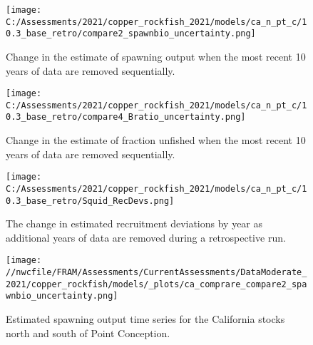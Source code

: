 \documentclass[11pt,
  english,
  a4paper,
]{article}
\begin{document}

\begin{figure}
\centering
\texttt{[image: C:/Assessments/2021/copper\_rockfish\_2021/models/ca\_n\_pt\_c/10.3\_base\_retro/compare2\_spawnbio\_uncertainty.png]}
\caption{Change in the estimate of spawning output when the most recent 10 years of data are removed sequentially.\label{fig:retro-ssb}}
\end{figure}

\tagmcend\tagstructend


\begin{figure}
\centering
\texttt{[image: C:/Assessments/2021/copper\_rockfish\_2021/models/ca\_n\_pt\_c/10.3\_base\_retro/compare4\_Bratio\_uncertainty.png]}
\caption{Change in the estimate of fraction unfished when the most recent 10 years of data are removed sequentially.\label{fig:retro-depl}}
\end{figure}

\tagmcend\tagstructend


\begin{figure}
\centering
\texttt{[image: C:/Assessments/2021/copper\_rockfish\_2021/models/ca\_n\_pt\_c/10.3\_base\_retro/Squid\_RecDevs.png]}
\caption{The change in estimated recruitment deviations by year as additional years of data are removed during a retrospective run.\label{fig:retro-squid}}
\end{figure}

\tagmcend\tagstructend

\newpage


\begin{figure}
\centering
\texttt{[image: //nwcfile/FRAM/Assessments/CurrentAssessments/DataModerate\_2021/copper\_rockfish/models/\_plots/ca\_comprare\_compare2\_spawnbio\_uncertainty.png]}
\caption{Estimated spawning output time series for the California stocks north and south of Point Conception.\label{fig:ssb-ca-compare}}
\end{figure}

\tagmcend\tagstructend
\end{document}

